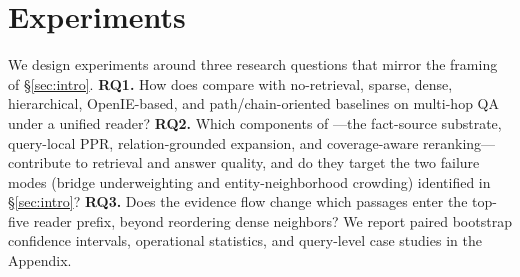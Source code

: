 %
%
%

\section{Experiments}
\label{sec:experiments}

We design experiments around three research questions that mirror the
framing of \S\ref{sec:intro}. \textbf{RQ1.} How does \methodname{}
compare with no-retrieval, sparse, dense, hierarchical, OpenIE-based,
and path/chain-oriented baselines on multi-hop QA under a unified reader?
\textbf{RQ2.} Which components of \methodname{}---the fact-source
substrate, query-local PPR, relation-grounded expansion, and
coverage-aware reranking---contribute to retrieval and answer quality,
and do they target the two failure modes (bridge underweighting and
entity-neighborhood crowding) identified in \S\ref{sec:intro}?
\textbf{RQ3.} Does the evidence flow change which passages enter the
top-five reader prefix, beyond reordering dense neighbors? We report
paired bootstrap confidence intervals, operational statistics, and
query-level case studies in the Appendix.

